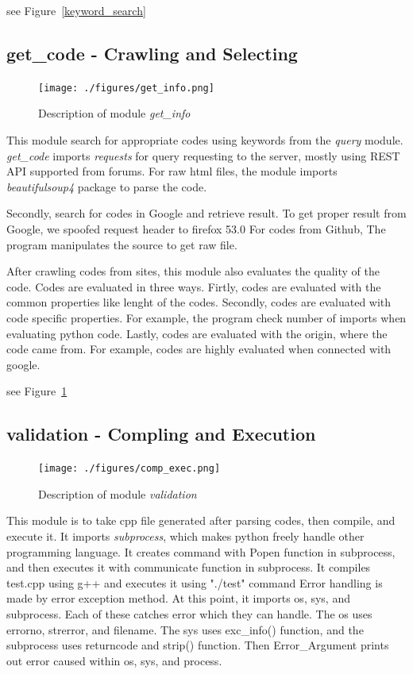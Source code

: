 \documentclass[conference]{IEEEtran}
\begin{document}
see Figure~\ref{keyword_search}

\subsection{get\_code - Crawling and Selecting} %
\label{sub:get_code}
\begin{figure}[ht]
\centering
\texttt{[image: ./figures/get\_info.png]}
\caption{Description of module \textit{get\_info}}
\label{get_info}
\end{figure}

This module search for appropriate codes using keywords from the \textit{query} module.
\textit{get\_code} imports \textit{requests} for query requesting to the server, mostly using REST API supported from forums.
For raw html files, the module imports \textit{beautifulsoup4} package to parse the code.

Secondly, search for codes in Google and retrieve result.
To get proper result from Google, we spoofed request header to firefox 53.0
For codes from Github, The program manipulates the source to get raw file.

After crawling codes from sites, this module also evaluates the quality of the code.
Codes are evaluated in three ways.
Firtly, codes are evaluated with the common properties like lenght of the codes.
Secondly, codes are evaluated with code specific properties. 
For example, the program check number of imports when evaluating python code.
Lastly, codes are evaluated with the origin, where the code came from.
For example, codes are highly evaluated when connected with google.

see Figure~\ref{get_info}

\subsection{validation - Compling and Execution} %
\label{sub:validation}

\label{sub:validation}
\begin{figure}[ht]
\centering
\texttt{[image: ./figures/comp\_exec.png]}
\caption{Description of module \textit{validation}}
\label{validation}
\end{figure}
This module is to take cpp file generated after parsing codes, then compile, and execute it.
It imports \textit{subprocess}, which makes python freely handle other programming language.
It creates command with Popen function in subprocess, and then executes it with communicate function in subprocess.
It compiles test.cpp using g++ and executes it using "./test" command
Error handling is made by error exception method. 
At this point, it imports os, sys, and subprocess. 
Each of these catches error which they can handle.
The os uses errorno, strerror, and filename.
The sys uses exc\_info() function, and the subprocess uses returncode and strip() function.
Then Error\_Argument prints out error caused within os, sys, and process.
\end{document}
